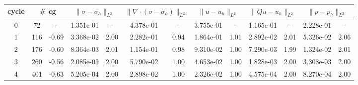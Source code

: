 \documentclass[10pt]{report}
\begin{document}
\begin{table}[H]
\begin{center}
\begin{tabular}{|c|c|c|c|c|c|c|c|c|c|c|c|c|} \hline
cycle & 
\multicolumn{2}{|c|}{\# cg} & 
\multicolumn{2}{|c|}{$ \|\sigma - \sigma_h\|_{L^2} $} & 
\multicolumn{2}{|c|}{$ \|\nabla\cdot(\sigma - \sigma_h)\|_{L^2} $} & 
\multicolumn{2}{|c|}{$ \|u - u_h\|_{L^2} $} & 
\multicolumn{2}{|c|}{$ \|Qu - u_h\|_{L^2} $} & 
\multicolumn{2}{|c|}{$ \|p - p_h\|_{L^2} $}\\ \hline
0 & 72 & - & 1.351e-01 & - & 4.378e-01 & - & 3.755e-01 & - & 1.165e-01 & - & 2.228e-01 & -\\ \hline
1 & 116 & -0.69 & 3.368e-02 & 2.00 & 2.282e-01 & 0.94 & 1.864e-01 & 1.01 & 2.892e-02 & 2.01 & 5.326e-02 & 2.06\\ \hline
2 & 176 & -0.60 & 8.364e-03 & 2.01 & 1.154e-01 & 0.98 & 9.310e-02 & 1.00 & 7.290e-03 & 1.99 & 1.324e-02 & 2.01\\ \hline
3 & 260 & -0.56 & 2.085e-03 & 2.00 & 5.790e-02 & 1.00 & 4.653e-02 & 1.00 & 1.828e-03 & 2.00 & 3.308e-03 & 2.00\\ \hline
4 & 401 & -0.63 & 5.205e-04 & 2.00 & 2.898e-02 & 1.00 & 2.326e-02 & 1.00 & 4.575e-04 & 2.00 & 8.270e-04 & 2.00\\ \hline
\end{tabular}
\end{center}
\end{table}
\end{document}
